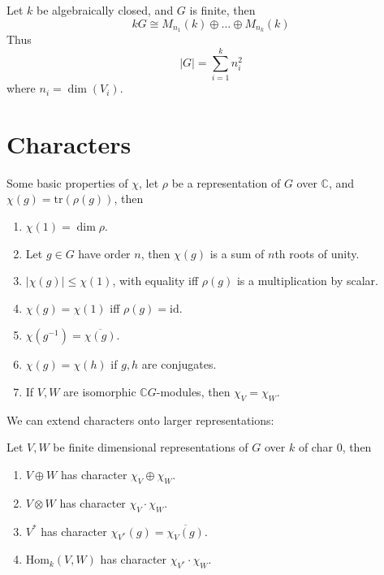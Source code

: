 \documentclass[openany]{book}
\newcommand{\tr}{\text{tr}}
\newcommand{\C}{\mathbb{C}}
\begin{document}
\begin{prop}
    Let $k$ be algebraically closed, and $G$ is finite, then 
    \begin{equation*}
        kG\cong M_{n_1}(k)\oplus\dots\oplus M_{n_k}(k)
    \end{equation*}
    Thus 
    \begin{equation*}
        |G|=\sum_{i=1}^kn_i^2
    \end{equation*}
    where $n_i=\dim(V_i)$.
\end{prop}


\section{Characters}


\begin{prop}
    Some basic properties of $\chi$, let $\rho$ be a representation of $G$ over $\C$, and $\chi(g)=\tr(\rho(g))$, then 
    \begin{enumerate}
        \item $\chi(1)=\dim\rho$.
        \item Let $g\in G$ have order $n$, then $\chi(g)$ is a sum of $n$th roots of unity.
        \item $|\chi(g)|\leq\chi(1)$, with equality iff $\rho(g)$ is a multiplication by scalar.
        \item $\chi(g)=\chi(1)$ iff $\rho(g)=\text{id}$.
        \item $\chi(g^{-1})=\overline{\chi(g)}$.
        \item $\chi(g)=\chi(h)$ if $g,h$ are conjugates.
        \item If $V,W$ are isomorphic $\C G$-modules, then $\chi_V=\chi_W$.
    \end{enumerate}
\end{prop}

We can extend characters onto larger representations:
\begin{prop}
    Let $V,W$ be finite dimensional representations of $G$ over $k$ of char $0$, then 
    \begin{enumerate}
        \item $V\oplus W$ has character $\chi_V\oplus\chi_W$.
        \item $V\otimes W$ has character $\chi_V\cdot\chi_W$.
        \item $V^*$ has character $\chi_{V^*}(g)=\overline{\chi_V(g)}$.
        \item $\text{Hom}_k(V,W)$ has character $\chi_{V^*}\cdot\chi_W$.
    \end{enumerate}
\end{prop}
\end{document}
